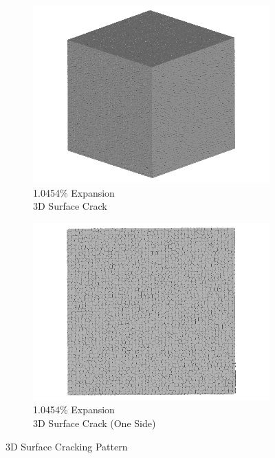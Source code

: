 \begin{figure}[ht!]
    \begin{subfigure}{.5\textwidth}
      \centering
      \includegraphics[width=0.5\linewidth]{Files/exp_3D/DEF/A30X-1C_4_3d.png}
      \caption{1.0454\% Expansion\\3D Surface Crack}
    \end{subfigure}%
    \begin{subfigure}{.5\textwidth}
      \centering
      \includegraphics[width=0.5\linewidth]{Files/exp_3D/DEF/A30X-1C_4_3ds.png}
      \caption{1.0454\% Expansion\\3D Surface Crack (One Side)}
    \end{subfigure}%

\caption{3D Surface Cracking Pattern}
\label{fig:A30_3Dcrack}
\end{figure}
